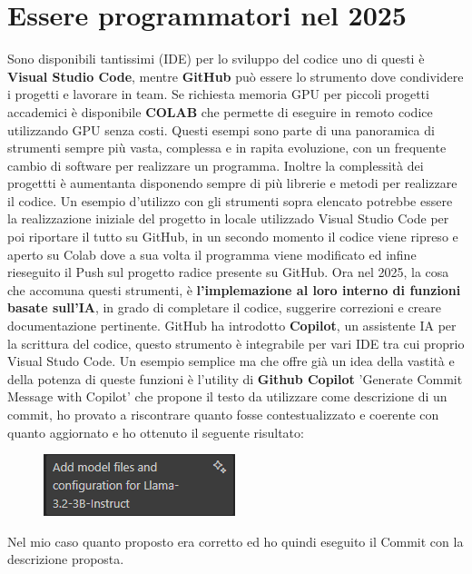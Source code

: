 \documentclass[12pt,a4paper,openright,twoside]{book}
\begin{document}
\section{Essere programmatori nel 2025}
Sono disponibili tantissimi (IDE) per lo sviluppo del codice uno di questi è \textbf{Visual Studio Code},
mentre \textbf{GitHub} può essere lo strumento dove condividere i progetti e lavorare in team.
Se richiesta memoria GPU per piccoli progetti accademici è disponibile \textbf{COLAB} che permette di eseguire in remoto codice utilizzando GPU senza costi.
Questi esempi sono  parte di una panoramica di strumenti sempre più vasta, complessa e in rapita evoluzione, con un frequente cambio di software per realizzare un programma.
Inoltre la complessità dei progettti è aumentanta disponendo sempre di più librerie e metodi per realizzare il codice.
Un esempio d'utilizzo con gli strumenti sopra elencato potrebbe essere la realizzazione iniziale del progetto in locale utilizzado Visual Studio Code per poi riportare il tutto su GitHub,
in un secondo momento il codice viene ripreso e aperto su Colab dove a sua volta il programma viene modificato ed infine rieseguito il Push sul progetto radice presente su GitHub.
Ora nel 2025, la cosa che accomuna questi strumenti, è \textbf{l'implemazione al loro interno di funzioni basate sull'IA}, in grado di completare il codice, suggerire correzioni e creare documentazione pertinente.
GitHub ha introdotto \textbf{Copilot}, un assistente IA per la scrittura del codice, questo strumento è integrabile per vari IDE tra cui proprio Visual Studo Code.
Un esempio semplice ma che offre già un idea della vastità e della potenza di queste funzioni è l'utility di \textbf{Github Copilot} 'Generate Commit Message with Copilot'
che propone il testo da utilizzare come descrizione di un commit, ho provato a riscontrare quanto fosse contestualizzato e coerente 
con quanto aggiornato e ho ottenuto il seguente risultato:
\begin{figure}[h]
    \centering
    \includegraphics[width=0.5\linewidth]{figures/commit.png}
    \label{fig:Commit-Autogenerato}
\end{figure}
\newline
Nel mio caso quanto proposto era corretto ed ho quindi eseguito il Commit con la descrizione proposta.
\end{document}
